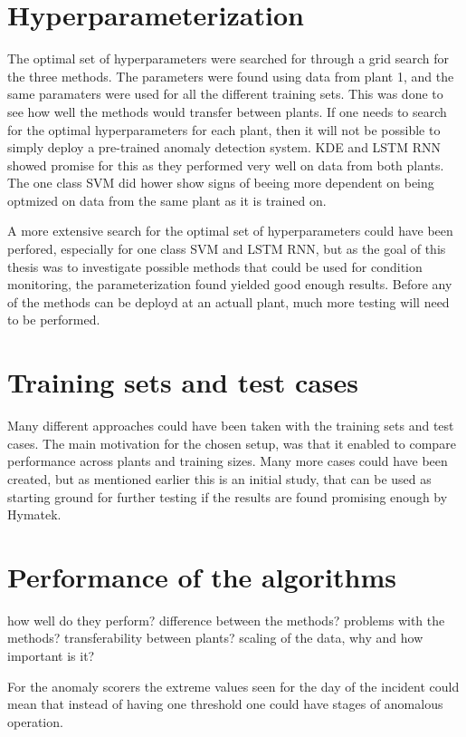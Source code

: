 \section{Hyperparameterization}
    The optimal set of hyperparameters were searched for through a grid search for the three methods. The parameters were found using data from plant 1, and the same paramaters were used for all the different training sets. This was done to see how well the methods would transfer between plants. If one needs to search for the optimal hyperparameters for each plant, then it will not be possible to simply deploy a pre-trained anomaly detection system. KDE and LSTM RNN showed promise for this as they performed very well on data from both plants. The one class SVM did hower show signs of beeing more dependent on being optmized on data from the same plant as it is trained on. 
    
    A more extensive search for the optimal set of hyperparameters could have been perfored, especially for one class SVM and LSTM RNN, but as the goal of this thesis was to investigate possible methods that could be used for condition monitoring, the parameterization found yielded good enough results. Before any of the methods can be deployd at an actuall plant, much more testing will need to be performed. 
    

\section{Training sets and test cases}
    Many different approaches could have been taken with the training sets and test cases. The main motivation for the chosen setup, was that it enabled to compare performance across plants and training sizes. Many more cases could have been created, but as mentioned earlier this is an initial study, that can be used as starting ground for further testing if the results are found promising enough by Hymatek. 




\section{Performance of the algorithms}
    how well do they perform?
    difference between the methods?
    problems with the methods?
    transferability between plants? 
    scaling of the data, why and how important is it? 
    
    For the anomaly scorers the extreme values seen for the day of the incident could mean that instead of having one threshold one could have stages of anomalous operation. 
    
